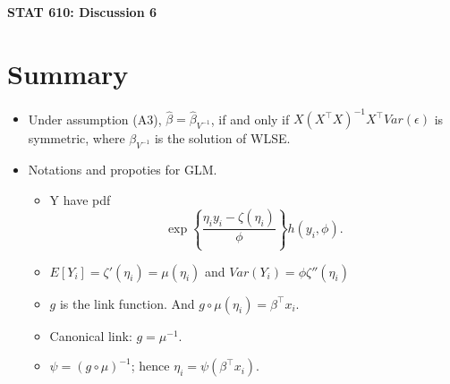 \documentclass[12pt]{extarticle}
\begin{document}
	
	\begin{center}
		{\large \bf STAT 610: Discussion 6}
	\end{center}
	\vspace{0.22cm}
	
\section{Summary}
\begin{itemize}
	\item Under assumption (A3), $\hat\beta=\hat \beta_{V^{-1}}$, if and only if 
	$X (X^\top X)^{-1}X^\top Var(\epsilon)$ is symmetric,
	where $\beta_{V^{-1}}$ is the solution of WLSE.
	
	
	\item Notations and propoties for GLM.
	\begin{itemize}
		\item Y have pdf
		$$\exp\left\{\frac{\eta_iy_i-\zeta(\eta_i)}{\phi}\right\}h(y_i,\phi).$$
		\item 
		$E[Y_i]=\zeta'(\eta_i)=\mu(\eta_i)$ and $Var(Y_i)=\phi\zeta''(\eta_i)$
		\item $g$ is the link function. And $g\circ \mu(\eta_i)=\beta^\top x_i.$
		\item Canonical link: $g=\mu^{-1}.$
		\item $\psi=(g\circ\mu)^{-1}$; hence $\eta_i=\psi(\beta^\top x_i). $
	\end{itemize}
\end{itemize}
\end{document}
